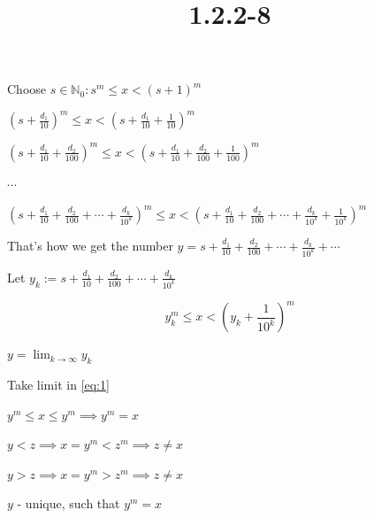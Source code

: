 \documentclass{article}
\title{1.2.2-8}
\begin{document}
\maketitle

Choose $s \in \mathbb{N}_0: s^{m} \leq x < (s+1)^{m}$

$(s + \frac{d_1}{10})^m \leq x < (s + \frac{d_1}{10} + \frac{1}{10})^m$

$(s + \frac{d_1}{10} + \frac{d_2}{100})^m \leq x < (s + \frac{d_1}{10} + \frac{d_2}{100} + \frac{1}{100})^m$

$\cdots$

$(s + \frac{d_1}{10} + \frac{d_2}{100} + \cdots + \frac{d_k}{10^k})^m \leq x < (s + \frac{d_1}{10} + \frac{d_2}{100} + \cdots + \frac{d_k}{10^k} + \frac {1}{10^k})^m$

That's how we get the number $y = s + \frac{d_1}{10} + \frac{d_2}{100} + \cdots + \frac{d_k}{10^k} + \cdots$

Let $y_k := s + \frac{d_1}{10} + \frac{d_2}{100} + \cdots + \frac{d_k}{10^k}$

\[y_k^m \leq x < (y_k + \frac{1}{10^k})^m \tag{1}\label{eq:1}\]

$y = \lim_{k \to \infty} y_k$

Take limit in \eqref{eq:1}

$y^m \leq x \leq y^m \implies y^m = x$

$y < z \implies x = y^m < z^m \implies z \neq x$

$y > z \implies x = y^m > z^m \implies z \neq x$

$y$ - unique, such that $y^m = x$
\end{document}
